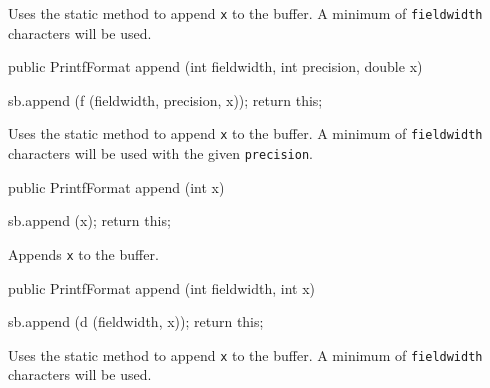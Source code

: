 \begin{tabb}   Uses the  static method to append \texttt{x} to the buffer.
   A minimum of \texttt{fieldwidth} characters will be used.
\end{tabb}
\begin{htmlonly}
\end{htmlonly}
\begin{code}

   public PrintfFormat append (int fieldwidth, int precision, double x)\begin{hide} {
      sb.append (f (fieldwidth, precision, x));
      return this;
   }\end{hide}
\end{code}
\begin{tabb}   Uses the  static method to append \texttt{x} to the buffer.
   A minimum of \texttt{fieldwidth} characters will be used with the given \texttt{precision}.
\end{tabb}
\begin{htmlonly}
\end{htmlonly}
\begin{code}

   public PrintfFormat append (int x)\begin{hide} {
      sb.append (x);
      return this;
   }\end{hide}
\end{code}
\begin{tabb}   Appends \texttt{x} to the buffer.
\end{tabb}
\begin{htmlonly}
\end{htmlonly}
\begin{code}

   public PrintfFormat append (int fieldwidth, int x)\begin{hide} {
      sb.append (d (fieldwidth, x));
      return this;
   }\end{hide}
\end{code}
\begin{tabb}   Uses the  static method to append \texttt{x} to the buffer.
   A minimum of \texttt{fieldwidth} characters will be used.
\end{tabb}
